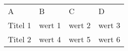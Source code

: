 \documentclass[
]{scrartcl}
\begin{document}
	\begin{tabular}{llll}
		A & B & C & D\\
		Titel 1 & wert 1 & wert 2 & wert 3\\
		Titel 2 & wert 4 & wert 5 & wert 6\\
		
	\end{tabular}
\end{document}
